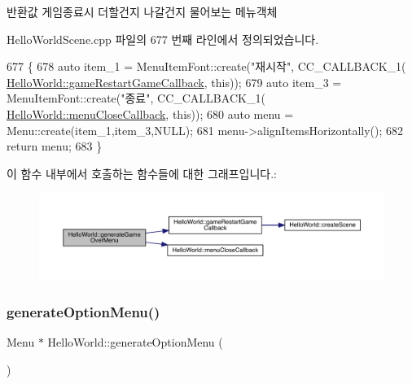 \begin{DoxyReturn}{반환값}
게임종료시 더할건지 나갈건지 물어보는 메뉴객체 
\end{DoxyReturn}


Hello\+World\+Scene.\+cpp 파일의 677 번째 라인에서 정의되었습니다.


\begin{DoxyCode}
677                                       \{
678     \textcolor{keyword}{auto} item\_1 = MenuItemFont::create(\textcolor{stringliteral}{"재시작"}, CC\_CALLBACK\_1(
      \hyperlink{class_hello_world_a73ad0d041144a1e610534fe5df41d556}{HelloWorld::gameRestartGameCallback}, \textcolor{keyword}{this}));
679     \textcolor{keyword}{auto} item\_3 = MenuItemFont::create(\textcolor{stringliteral}{"종료"}, CC\_CALLBACK\_1(
      \hyperlink{class_hello_world_ac4ab2f5e922e659d4f137591c0f6a9b0}{HelloWorld::menuCloseCallback}, \textcolor{keyword}{this}));
680     \textcolor{keyword}{auto} menu = Menu::create(item\_1,item\_3,NULL);
681     menu->alignItemsHorizontally();
682     \textcolor{keywordflow}{return} menu;
683 \}
\end{DoxyCode}
이 함수 내부에서 호출하는 함수들에 대한 그래프입니다.\+:
\nopagebreak
\begin{figure}[H]
\begin{center}
\leavevmode
\includegraphics[width=350pt]{d9/d98/class_hello_world_a7b22f04ccc721e47e59c4f5470768790_cgraph}
\end{center}
\end{figure}
\mbox{\label{class_hello_world_a24162678657656105f59887233f9c841}} 
\subsubsection{\texorpdfstring{generate\+Option\+Menu()}{generateOptionMenu()}}
{\footnotesize\ttfamily Menu $\ast$ Hello\+World\+::generate\+Option\+Menu (\begin{DoxyParamCaption}{ }\end{DoxyParamCaption})\hspace{0.3cm}{\ttfamily [protected]}}

